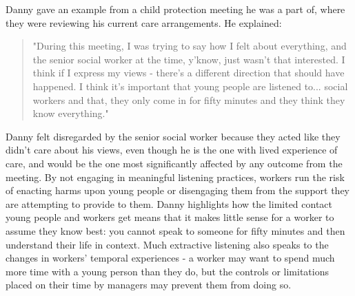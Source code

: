 Danny gave an example from a child protection meeting he was a part of, where they were reviewing his current care arrangements. He explained:
\begin{quote}
"During this meeting, I was trying to say how I felt about everything, and the senior social worker at the time, y'know, just wasn't that interested. I think if I express my views - there's a different direction that should have happened. I think it's important that young people are listened to... social workers and that, they only come in for fifty minutes and they think they know everything."
\end{quote}
Danny felt disregarded by the senior social worker because they acted like they didn't care about his views, even though he is the one with lived experience of care, and would be the one most significantly affected by any outcome from the meeting. By not engaging in meaningful listening practices, workers run the risk of enacting harms upon young people or disengaging them from the support they are attempting to provide to them. Danny highlights how the limited contact young people and workers get means that it makes little sense for a worker to assume they know best: you cannot speak to someone for fifty minutes and then understand their life in context. Much extractive listening also speaks to the changes in workers' temporal experiences - a worker may want to spend much more time with a young person than they do, but the  controls or limitations placed on their time by managers may prevent them from doing so.

